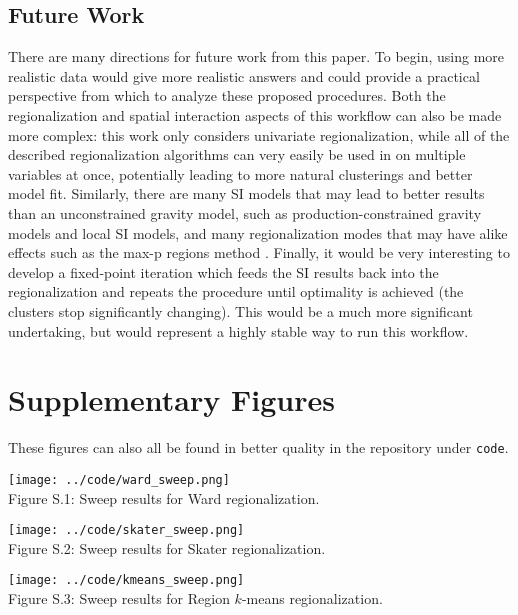 \documentclass{article}
\begin{document}
    \subsection{Future Work}
    There are many directions for future work from this paper. To begin, using more realistic data would give more realistic answers and could provide a practical perspective from which to analyze these proposed procedures. Both the regionalization and spatial interaction aspects of this workflow can also be made more complex: this work only considers univariate regionalization, while all of the described regionalization algorithms can very easily be used in on multiple variables at once, potentially leading to more natural clusterings and better model fit. Similarly, there are many SI models that may lead to better results than an unconstrained gravity model, such as production-constrained gravity models and local SI models, and many regionalization modes that may have alike effects such as the max-p regions method \cite{Wei2020}. Finally, it would be very interesting to develop a fixed-point iteration which feeds the SI results back into the regionalization and repeats the procedure until optimality is achieved (the clusters stop significantly changing). This would be a much more significant undertaking, but would represent a highly stable way to run this workflow.

    \pagebreak
    
    
    
    \pagebreak
    \section*{Supplementary Figures}
    These figures can also all be found in better quality in the repository under \texttt{code}.
    \begin{center}
        \texttt{[image: ../code/ward\_sweep.png]} \\
        Figure S.1: Sweep results for Ward regionalization.
    \end{center}

    \begin{center}
        \texttt{[image: ../code/skater\_sweep.png]} \\
        Figure S.2: Sweep results for Skater regionalization.
    \end{center}

    \begin{center}
        \texttt{[image: ../code/kmeans\_sweep.png]} \\
        Figure S.3: Sweep results for Region $k$-means regionalization.
    \end{center}
\end{document}
